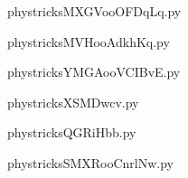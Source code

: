 
    \newcommand{\CaptionFigMXGVooOFDqLq}{<+Type your caption here+>}
    \begin{center}
        
    \end{center}
    phystricksMXGVooOFDqLq.py

    

    \clearpage
    


    \newcommand{\CaptionFigMVHooAdkhKq}{<+Type your caption here+>}
    \begin{center}
        
    \end{center}
    phystricksMVHooAdkhKq.py

    

    \clearpage
    


    \newcommand{\CaptionFigYMGAooVCIBvE}{<+Type your caption here+>}
    \begin{center}
        
    \end{center}
    phystricksYMGAooVCIBvE.py

    

    \clearpage
    


    \newcommand{\CaptionFigXSMDwcv}{<+Type your caption here+>}
    \begin{center}
        
    \end{center}
    phystricksXSMDwcv.py

    

    \clearpage
    


    \newcommand{\CaptionFigQGRiHbb}{<+Type your caption here+>}
    \begin{center}
        
    \end{center}
    phystricksQGRiHbb.py

    

    \clearpage
    


    \newcommand{\CaptionFigSMXRooCnrlNw}{<+Type your caption here+>}
    \begin{center}
        
    \end{center}
    phystricksSMXRooCnrlNw.py

